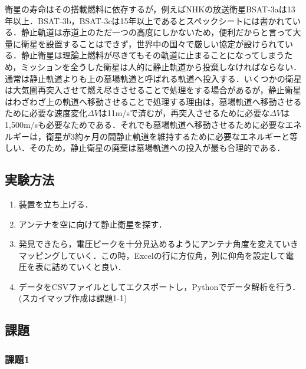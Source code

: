 \documentclass[a4j,10pt,oneside,openany]{jsbook}
\begin{document}
{衛星の寿命はその搭載燃料に依存するが，例えばNHKの放送衛星BSAT-3aは13年以上．BSAT-3b，BSAT-3cは15年以上であるとスペックシートには書かれている．静止軌道は赤道上のただ一つの高度にしかないため，便利だからと言って大量に衛星を設置することはできず，世界中の国々で厳しい協定が設けられている．静止衛星は理論上燃料が尽きてもその軌道に止まることになってしまうため，ミッションを全うした衛星は人的に静止軌道から投棄しなければならない．通常は静止軌道よりも上の墓場軌道と呼ばれる軌道へ投入する．いくつかの衛星は大気圏再突入させて燃え尽きさせることで処理をする場合があるが，静止衛星はわざわざ上の軌道へ移動させることで処理する理由は，墓場軌道へ移動させるために必要な速度変化$\Delta V$は11m/sで済むが，再突入させるために必要な$\Delta V$は1,500m/sも必要なためである．それでも墓場軌道へ移動させるために必要なエネルギーは，衛星が3約ヶ月の間静止軌道を維持するために必要なエネルギーと等しい．そのため，静止衛星の廃棄は墓場軌道への投入が最も合理的である．

\subsection{実験方法}
\begin{enumerate}[1．]
  \item 装置を立ち上げる．
  \item アンテナを空に向けて静止衛星を探す．
  \item 発見できたら，電圧ピークを十分見込めるようにアンテナ角度を変えていきマッピングしていく．この時，Excelの行に方位角，列に仰角を設定して電圧を表に詰めていくと良い．
  \item データをCSVファイルとしてエクスポートし，Pythonでデータ解析を行う．(スカイマップ作成は課題1-1)
\end{enumerate}

\subsection{課題}
\subsubsection{課題1}

}
\end{document}
